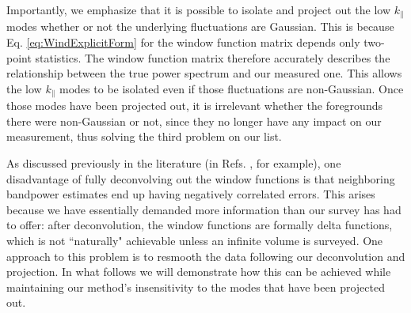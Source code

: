 \documentclass[twocolumn,aps,prd,nofootinbib,showpacs]{revtex4-1}
\begin{document}
Importantly, we emphasize that it is possible to isolate and project out the low $k_\parallel$ modes whether or not the underlying fluctuations are Gaussian.  This is because Eq. \eqref{eq:WindExplicitForm} for the window function matrix depends only two-point statistics.  The window function matrix therefore accurately describes the relationship between the true power spectrum and our measured one.  This allows the low $k_\parallel$ modes to be isolated even if those fluctuations are non-Gaussian.  Once those modes have been projected out, it is irrelevant whether the foregrounds there were non-Gaussian or not, since they no longer have any impact on our measurement, thus solving the third problem on our list.

As discussed previously in the literature (in Refs. \cite{Dillon2014,Shaw2014b}, for example), one disadvantage of fully deconvolving out the window functions is that neighboring bandpower estimates end up having negatively correlated errors.  This arises because we have essentially demanded more information than our survey has had to offer: after deconvolution, the window functions are formally delta functions, which is not ``naturally" achievable unless an infinite volume is surveyed.  One approach to this problem is to resmooth the data following our deconvolution and projection.  In what follows we will demonstrate how this can be achieved while maintaining our method's insensitivity to the modes that have been projected out.
\end{document}
